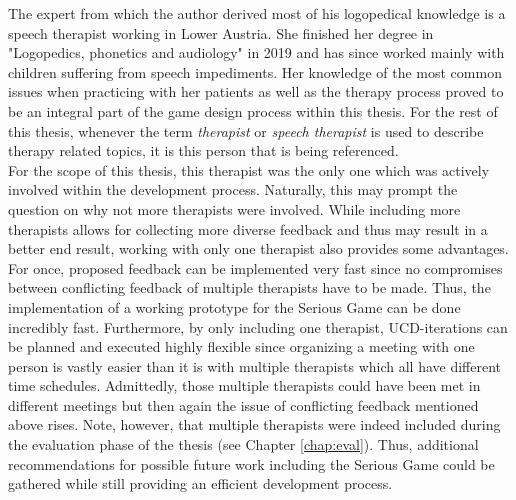 \documentclass[draft,final]{vutinfth} %
\begin{document}
The expert from which the author derived most of his logopedical knowledge is a speech therapist working in Lower Austria. She finished her degree in "Logopedics, phonetics and audiology" in 2019 and has since worked mainly with children suffering from speech impediments. 
Her knowledge of the most common issues when practicing with her patients as well as the therapy process proved to be an integral part of the game design process within this thesis. For the rest of this thesis, whenever the term \emph{therapist} or \emph{speech therapist} is used to describe therapy related topics, it is this person that is being referenced. \\

For the scope of this thesis, this therapist was the only one which was actively involved within the development process. Naturally, this may prompt the question on why not more therapists were involved. While including more therapists allows for collecting more diverse feedback and thus may result in a better end result, working with only one therapist also provides some advantages. For once, proposed feedback can be implemented very fast since no compromises between conflicting feedback of multiple therapists have to be made. Thus, the implementation of a working prototype for the Serious Game can be done incredibly fast. Furthermore, by only including one therapist, UCD-iterations can be planned and executed highly flexible since organizing a meeting with one person is vastly easier than it is with multiple therapists which all have different time schedules. Admittedly, those multiple therapists could have been met in different meetings but then again the issue of conflicting feedback mentioned above rises. Note, however, that multiple therapists were indeed included during the evaluation phase of the thesis (see Chapter \ref{chap:eval}). Thus, additional recommendations for possible future work including the Serious Game could be gathered while still providing an efficient development process.
\end{document}
